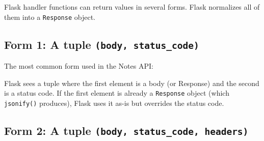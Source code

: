 Flask handler functions can return values in several forms. Flask normalizes all of them into a \texttt{Response} object.

\subsection*{\texorpdfstring{Form 1: A tuple \texttt{(body,}\allowbreak{}\texttt{\ status\_code)}}{Form 1: A tuple}}\label{34-response-handling:form-1-a-tuple-body-status-code}

The most common form used in the Notes API:

\begin{codebox}[short]

\begin{Shaded}
\begin{Highlighting}[]
\end{Highlighting}
\end{Shaded}

\end{codebox}

\noindent{}Flask sees a tuple where the first element is a body (or Response) and the second is a status code. If the first element is already a \texttt{Response} object (which \texttt{jsonify()} produces), Flask uses it as-is but overrides the status code.

\subsection*{\texorpdfstring{Form 2: A tuple
\texttt{(body,}\allowbreak{}\texttt{\ status\_}\allowbreak{}\texttt{code,}\allowbreak{}\texttt{\ headers)}}{Form 2: A tuple}}\label{34-response-handling:form-2-a-tuple-body-status-code-headers}

\begin{codebox}[short]

\begin{Shaded}
\begin{Highlighting}[]
\NormalTok{ (}
\NormalTok{: }\NormalTok{\}),}
    \NormalTok{,}
\NormalTok{    \{}\NormalTok{: }\NormalTok{\},}
\NormalTok{)}
\end{Highlighting}
\end{Shaded}

\end{codebox}

